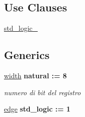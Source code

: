 \subsection*{Use Clauses}
 \begin{DoxyCompactItemize}
\item 
\hyperlink{group___generic_buffer_gacd03516902501cd1c7296a98e22c6fcb}{std\+\_\+logic\+\_}   
\end{DoxyCompactItemize}
\subsection*{Generics}
 \begin{DoxyCompactItemize}
\item 
\hyperlink{group___generic_buffer_gae47d961480346c1d82439a66505e6e7d}{width} {\bfseries {\bfseries \textcolor{vhdlchar}{natural}\textcolor{vhdlchar}{ }\textcolor{vhdlchar}{ }\textcolor{vhdlchar}{\+:}\textcolor{vhdlchar}{=}\textcolor{vhdlchar}{ }\textcolor{vhdlchar}{ } \textcolor{vhdldigit}{8} \textcolor{vhdlchar}{ }}}
\begin{DoxyCompactList}\small\item\em numero di bit del registro \end{DoxyCompactList}\item 
\hyperlink{group___generic_buffer_ga9079dbf8b7827a9cf522497d56994375}{edge} {\bfseries {\bfseries \textcolor{vhdlchar}{std\+\_\+logic}\textcolor{vhdlchar}{ }\textcolor{vhdlchar}{ }\textcolor{vhdlchar}{\+:}\textcolor{vhdlchar}{=}\textcolor{vhdlchar}{ }\textcolor{vhdlchar}{ }\textcolor{vhdlchar}{\textquotesingle{}}\textcolor{vhdlchar}{ } \textcolor{vhdldigit}{1} \textcolor{vhdlchar}{ }\textcolor{vhdlchar}{\textquotesingle{}}\textcolor{vhdlchar}{ }}}
\end{DoxyCompactItemize}

